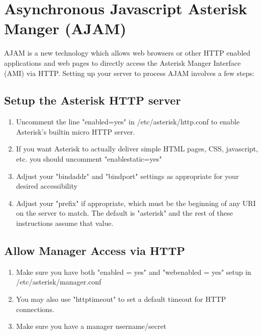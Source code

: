 \section{Asynchronous Javascript Asterisk Manger (AJAM)}

AJAM is a new technology which allows web browsers or other HTTP enabled 
applications and web pages to directly access the Asterisk Manger 
Interface (AMI) via HTTP.  Setting up your server to process AJAM 
involves a few steps:

\subsection{Setup the Asterisk HTTP server}

\begin{enumerate}
\item Uncomment the line "enabled=yes" in /etc/asterisk/http.conf to enable
   Asterisk's builtin micro HTTP server.

\item If you want Asterisk to actually deliver simple HTML pages, CSS, 
   javascript, etc. you should uncomment "enablestatic=yes"

\item Adjust your "bindaddr" and "bindport" settings as appropriate for 
   your desired accessibility

\item Adjust your "prefix" if appropriate, which must be the beginning of
   any URI on the server to match.  The default is "asterisk" and the 
   rest of these instructions assume that value.
\end{enumerate}

\subsection{Allow Manager Access via HTTP}

\begin{enumerate}
\item Make sure you have both "enabled = yes" and "webenabled = yes" setup 
   in /etc/asterisk/manager.conf

\item You may also use "httptimeout" to set a default timeout for HTTP 
   connections.

\item Make sure you have a manager username/secret
\end{enumerate}

